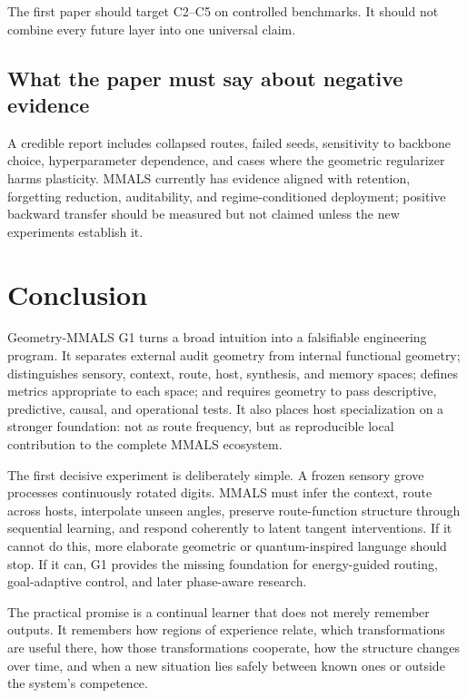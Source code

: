 \documentclass[11pt,a4paper]{article}
\begin{document}
The first paper should target C2--C5 on controlled benchmarks. It should not combine every future layer into one universal claim.

\subsection{What the paper must say about negative evidence}

A credible report includes collapsed routes, failed seeds, sensitivity to backbone choice, hyperparameter dependence, and cases where the geometric regularizer harms plasticity. MMALS currently has evidence aligned with retention, forgetting reduction, auditability, and regime-conditioned deployment; positive backward transfer should be measured but not claimed unless the new experiments establish it.

\section{Conclusion}

Geometry-MMALS G1 turns a broad intuition into a falsifiable engineering program. It separates external audit geometry from internal functional geometry; distinguishes sensory, context, route, host, synthesis, and memory spaces; defines metrics appropriate to each space; and requires geometry to pass descriptive, predictive, causal, and operational tests. It also places host specialization on a stronger foundation: not as route frequency, but as reproducible local contribution to the complete MMALS ecosystem.

The first decisive experiment is deliberately simple. A frozen sensory grove processes continuously rotated digits. MMALS must infer the context, route across hosts, interpolate unseen angles, preserve route-function structure through sequential learning, and respond coherently to latent tangent interventions. If it cannot do this, more elaborate geometric or quantum-inspired language should stop. If it can, G1 provides the missing foundation for energy-guided routing, goal-adaptive control, and later phase-aware research.

\begin{plainbox}
The practical promise is a continual learner that does not merely remember outputs. It remembers how regions of experience relate, which transformations are useful there, how those transformations cooperate, how the structure changes over time, and when a new situation lies safely between known ones or outside the system's competence.
\end{plainbox}
\end{document}
